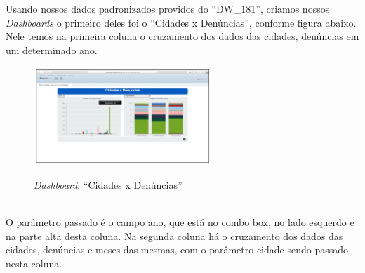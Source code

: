 Usando nossos dados padronizados providos do ``DW\_181'', criamos nossos \textit{Dashboards} o primeiro deles foi o ``Cidades x Denúncias'', conforme figura abaixo. Nele temos na primeira coluna o cruzamento dos dados das cidades, denúncias em um determinado ano.

\begin{figure}[H]
	\vspace*{0,2cm}
    \centering
    \caption{\textit{Dashboard}: ``Cidades x Denúncias''}
    \includegraphics[width=0.6\textwidth]{./04-figuras/figura-dashboard-cxd}
    \label{fig:ilustfigdcxd}
\end{figure}
\vspace*{-0,9cm}
{\raggedright {}} \\

O parâmetro passado \'{e} o campo ano, que est\'{a} no combo box, no lado esquerdo e na parte alta desta coluna. Na segunda coluna h\'{a} o cruzamento dos dados das cidades, denúncias e meses das mesmas, com o parâmetro cidade sendo passado nesta coluna.